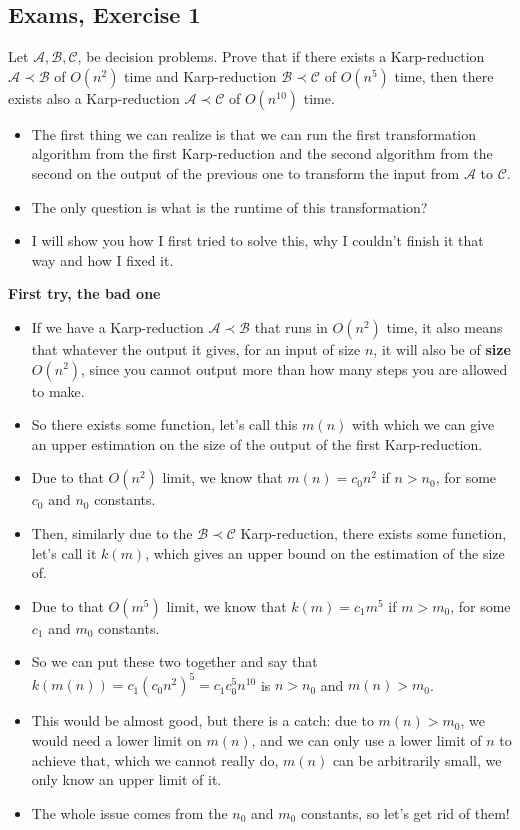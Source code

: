 \subsection {Exams, Exercise 1}

Let $\mathcal{A}, \mathcal{B}, \mathcal{C}$, be decision problems. Prove that if there exists a Karp-reduction $\mathcal{A} \prec \mathcal{B}$ of $O(n^2)$ time and Karp-reduction $\mathcal{B} \prec \mathcal{C}$ of $O(n^5)$ time, then there exists also a Karp-reduction $\mathcal{A}\prec{}\mathcal{C}$ of $O(n^10)$ time.


\begin{itemize}
    \item The first thing we can realize is that we can run the first transformation algorithm from the first Karp-reduction and the second algorithm from the second on the output of the previous one to transform the input from $\mathcal{A}$ to $\mathcal{C}$.
    \item The only question is what is the runtime of this transformation?
    \item I will show you how I first tried to solve this, why I couldn't finish it that way and how I fixed it.
\end{itemize}


\textbf{First try, the bad one}

\begin{itemize}
    \item If we have a Karp-reduction $\mathcal{A} \prec \mathcal{B}$ that runs in $O(n^2)$ time, it also means that whatever the output it gives, for an input of size $n$, it will also be of \textbf{size} $O(n^2)$, since you cannot output more than how many steps you are allowed to make.
    \item So there exists some function, let's call this $m(n)$ with which we can give an upper estimation on the size of the output of the first Karp-reduction.
    \item Due to that $O(n^2)$ limit, we know that $m(n) = c_0n^2$ if $n>n_0$, for some $c_0$ and $n_0$ constants.
    \item Then, similarly due to the $\mathcal{B} \prec \mathcal{C}$ Karp-reduction, there exists some function, let's call it $k(m)$, which gives an upper bound on the estimation of the size of.
    \item Due to that $O(m^5)$ limit, we know that $k(m) = c_1m^5$ if $m>m_0$, for some $c_1$ and $m_0$ constants.
    \item So we can put these two together and say that  $k(m(n)) = c_1(c_0n^2)^5 = c_1c_0^5n^10$ is $n > n_0$ and $m(n) > m_0$.
    \item This would be almost good, but there is a catch: due to $m(n) > m_0$, we would need a lower limit on $m(n)$, and we can only use a lower limit of $n$ to achieve that, which we cannot really do, $m(n)$ can be arbitrarily small, we only know an upper limit of it.
    \item The whole issue comes from the $n_0$ and $m_0$ constants, so let's get rid of them!
\end{itemize}

